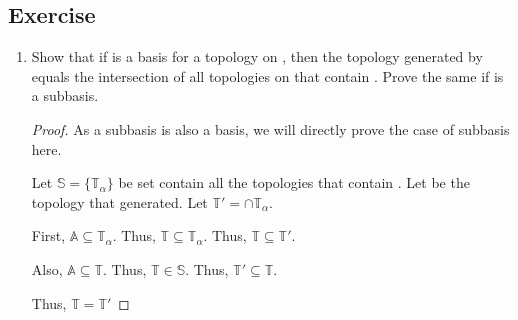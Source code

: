 \subsection{Exercise}

      \begin{enumerate}
            \item Show that if  is a basis for a topology on , then the topology generated by  equals the intersection of all topologies on  that contain . Prove the same if  is a subbasis.
            
            \begin{proof}
                  As a subbasis is also a basis, we will directly prove the case of subbasis here.

                  Let $ \mathbb{S} = \{ \mathbb{T}_{\alpha} \} $ be set contain all the topologies that contain .
                  Let  be the topology that  generated.
                  Let $ \displaystyle \mathbb{T}' = \cap\mathbb{T}_{\alpha} $.

                  First, $ \mathbb{A} \subseteq \mathbb{T}_{\alpha} $.
                  Thus, $ \mathbb{T} \subseteq \mathbb{T}_{\alpha} $.
                  Thus, $ \mathbb{T} \subseteq \mathbb{T}' $.

                  Also, $ \mathbb{A} \subseteq \mathbb{T} $.
                  Thus, $ \mathbb{T} \in \mathbb{S} $.
                  Thus, $ \mathbb{T}' \subseteq \mathbb{T} $.

                  Thus, $ \mathbb{T} = \mathbb{T}' $
            \end{proof}


      \end{enumerate}